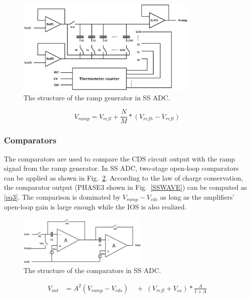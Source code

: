 \begin{figure}[htbp]
	\centerline{\includegraphics[width=3.5in]{./Figures/RAMP.eps}}
	\caption{The structure of the ramp generator in SS ADC.}
	\label{RAMP}
\end{figure} 

\begin{equation}
	V_{ramp}=V_{refl}+\frac{N}{M}\ast\left(V_{refh}-V_{refl}\right)
	\label{eq2}
\end{equation}

\subsubsection{Comparators}

The comparators are used to compare the CDS circuit output with the ramp signal from the ramp generator. 
In SS ADC, two-stage open-loop comparators can be applied as shown in Fig.~\ref{COM}. According to the law of charge conservation, 
the comparator output (PHASE3 shown in Fig.~\ref{SSWAVE}) can be computed as \eqref{eq3}. The comparison is dominated by $V_{ramp}-V_{cds}$ as long as the amplifiers’ open-loop gain 
is large enough while the IOS is also realized.%

\begin{figure}[htbp]
	\centerline{\includegraphics[width=2.5in]{./Figures/COM.eps}}
	\caption{The structure of the comparators in SS ADC.}
	\label{COM}
\end{figure} 

\begin{equation}
	\begin{aligned}
		V_{out}&=A^2(V_{ramp}-V_{cds})
		&\;{+}\;\left(V_{refl}+V_{os}\right)\ast\frac{A}{1+A} 		
		\label{eq3}
	\end{aligned}
\end{equation}

